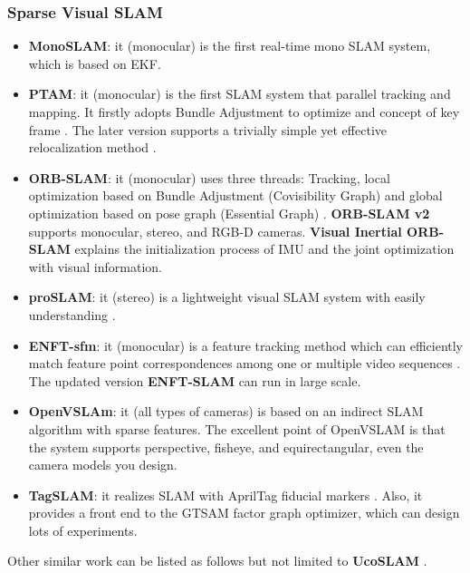 \documentclass[journal,transmag]{IEEEtran}
\begin{document}
\subsubsection{Sparse Visual SLAM}
\begin{itemize}
    \item \textbf{MonoSLAM}: it (monocular) is the first real-time mono SLAM system, which is based on EKF\cite{davison2007monoslam}. 
    \item \textbf{PTAM}: it (monocular) is the first SLAM system that parallel tracking and mapping. It firstly adopts Bundle Adjustment to optimize and concept of key frame \cite{klein2007parallel}\cite{klein2009parallel}. The later version supports a trivially simple yet effective relocalization method \cite{klein2008improving}.
    \item \textbf{ORB-SLAM}: it (monocular) uses three threads: Tracking, local optimization based on Bundle Adjustment (Covisibility Graph) and global optimization based on pose graph (Essential Graph) \cite{rublee2011orb}\cite{mur2015orb}. \textbf{ORB-SLAM v2} \cite{mur2017orb} supports monocular, stereo, and RGB-D cameras. \textbf{Visual Inertial ORB-SLAM} \cite{mur2017visual}\cite{forster2016manifold} explains the initialization process of IMU and the joint optimization with visual information.
    \item \textbf{proSLAM}: it (stereo) is a lightweight visual SLAM system with easily understanding \cite{2018-schlegel-proslam}.
    \item \textbf{ENFT-sfm}: it (monocular) is a feature tracking method which can efficiently match feature point correspondences among one or multiple video sequences \cite{zhang2016efficient}. The updated version \textbf{ENFT-SLAM} can run in large scale.
    \item \textbf{OpenVSLAm}: it (all types of cameras) \cite{openvslam2019} is based on an indirect SLAM algorithm with sparse features. The excellent point of OpenVSLAM is that the system supports perspective, fisheye, and equirectangular, even the camera models you design.
    \item \textbf{TagSLAM}: it realizes SLAM with AprilTag fiducial markers \cite{pfrommer2019tagslam}. Also, it provides a front end to the GTSAM factor graph optimizer, which can design lots of experiments.
\end{itemize}

Other similar work can be listed as follows but not limited to \textbf{UcoSLAM} \cite{munoz2019ucoslam}.
\end{document}
